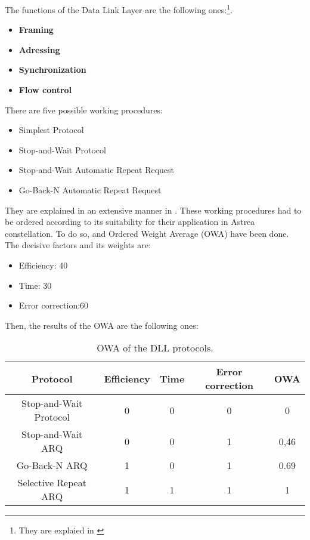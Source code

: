 The functions of the Data Link Layer are the following ones:\footnote{They are explaied in \cite[Chapter 1, Section 1]{annex3}}.

\begin{itemize}
\item \textbf{Framing}
\item \textbf{Adressing}
\item \textbf{Synchronization}
\item \textbf{Flow control}
\end{itemize}

There are five possible working procedures:

\begin{itemize}
\item Simplest Protocol
\item Stop-and-Wait Protocol
\item Stop-and-Wait Automatic Repeat Request
\item Go-Back-N Automatic Repeat Request
\end{itemize}

They are explained in an extensive manner in \cite[Chapter 1, Section 1]{annex3}. These working procedures had to be ordered according to its suitability for their application in Astrea constellation. To do so, and Ordered Weight Average (OWA) have been done. The decisive factors and its weights are: 

\begin{itemize}
\item Efficiency: 40
\item Time: 30
\item Error correction:60
\end{itemize}

Then, the results of the OWA are the following ones:

\begin{table}[H]
\begin{center}
\begin{tabular}{ | c | c | c | c | c |}
\hline
Protocol&Efficiency&Time&Error correction&OWA\\
\hline
Stop-and-Wait Protocol&0&0&0&0\\
\hline
Stop-and-Wait ARQ&0&0&1&0,46\\
\hline
Go-Back-N ARQ&1&0&1&0.69\\
\hline
Selective Repeat ARQ&1&1&1&1\\
\hline
\end{tabular}
\caption{OWA of the DLL protocols.}
\end{center}
\end{table} 

